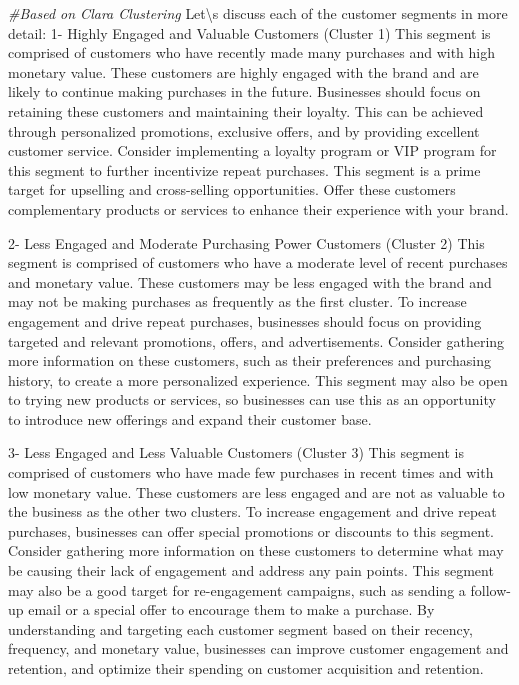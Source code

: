 \documentclass[
]{article}
\newenvironment{Shaded}{\begin{snugshade}}{\end{snugshade}}
\newcommand{\CommentTok}[1]{\textcolor[rgb]{0.56,0.35,0.01}{\textit{#1}}}
\newcommand{\SpecialCharTok}[1]{\textcolor[rgb]{0.00,0.00,0.00}{#1}}
\newcommand{\StringTok}[1]{\textcolor[rgb]{0.31,0.60,0.02}{#1}}
\begin{document}
\begin{Shaded}
\begin{Highlighting}[]
\CommentTok{\#Based on Clara Clustering }
\StringTok{\textquotesingle{}}
\StringTok{Let}\SpecialCharTok{\textbackslash{}\textquotesingle{}}\StringTok{s discuss each of the customer segments in more detail:}
\StringTok{  }
\StringTok{1{-} Highly Engaged and Valuable Customers (Cluster 1)}
\StringTok{This segment is comprised of customers who have recently made many purchases and with high monetary value.}
\StringTok{These customers are highly engaged with the brand and are likely to continue making purchases in the future.}
\StringTok{Businesses should focus on retaining these customers and maintaining their loyalty. This can be achieved through personalized promotions, exclusive offers, and by providing excellent customer service.}
\StringTok{Consider implementing a loyalty program or VIP program for this segment to further incentivize repeat purchases.}
\StringTok{This segment is a prime target for upselling and cross{-}selling opportunities. Offer these customers complementary products or services to enhance their experience with your brand.}

\StringTok{2{-} Less Engaged and Moderate Purchasing Power Customers (Cluster 2)}
\StringTok{This segment is comprised of customers who have a moderate level of recent purchases and monetary value.}
\StringTok{These customers may be less engaged with the brand and may not be making purchases as frequently as the first cluster.}
\StringTok{To increase engagement and drive repeat purchases, businesses should focus on providing targeted and relevant promotions, offers, and advertisements.}
\StringTok{Consider gathering more information on these customers, such as their preferences and purchasing history, to create a more personalized experience.}
\StringTok{This segment may also be open to trying new products or services, so businesses can use this as an opportunity to introduce new offerings and expand their customer base.}

\StringTok{3{-} Less Engaged and Less Valuable Customers (Cluster 3)}
\StringTok{This segment is comprised of customers who have made few purchases in recent times and with low monetary value.}
\StringTok{These customers are less engaged and are not as valuable to the business as the other two clusters.}
\StringTok{To increase engagement and drive repeat purchases, businesses can offer special promotions or discounts to this segment.}
\StringTok{Consider gathering more information on these customers to determine what may be causing their lack of engagement and address any pain points.}
\StringTok{This segment may also be a good target for re{-}engagement campaigns, such as sending a follow{-}up email or a special offer to encourage them to make a purchase.}
\StringTok{By understanding and targeting each customer segment based on their recency, frequency, and monetary value, businesses can improve customer engagement and retention, and optimize their spending on customer acquisition and retention.}

\StringTok{\textquotesingle{}}
\end{Highlighting}
\end{Shaded}
\end{document}
